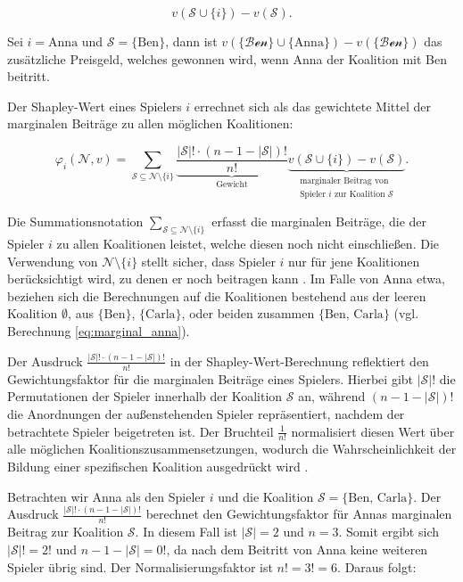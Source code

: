\begin{equation}
v(\mathcal{S} \cup \{i\}) - v(\mathcal{S}).
\label{eq:marignal}
\end{equation}


Sei $i = \text{Anna}$ und $\mathcal{S} = \{\text{Ben}\}$, dann ist $v(\mathcal{\{\text{Ben}\}} \cup \{\text{Anna}\}) - v(\mathcal{\{\text{Ben}\}})$ das
zusätzliche Preisgeld, welches gewonnen wird, wenn Anna der Koalition mit Ben beitritt. 


Der Shapley-Wert eines Spielers $i$ errechnet sich als das gewichtete Mittel der marginalen Beiträge zu allen möglichen Koalitionen:

\begin{equation}
\varphi_i (\mathcal{N}, v) = \sum_{\mathcal{S} \subseteq \mathcal{N} \setminus \{i\}} \underbrace{\frac{|\mathcal{S}|! \cdot (n - 1 - |\mathcal{S}|)!}{n!}}_{\text{Gewicht}} \underbrace{v(\mathcal{S} \cup \{i\}) - v(\mathcal{S})}_{\substack{\text{marginaler Beitrag von} \\ \text{Spieler $i$ zur Koalition $\mathcal{S}$}}}.
\end{equation}

Die Summationsnotation \(\sum_{\mathcal{S} \subseteq \mathcal{N} \setminus \{i\}}\) erfasst die marginalen Beiträge, 
die der Spieler \( i \) zu allen Koalitionen leistet, welche diesen noch nicht einschließen. Die Verwendung von 
\(\mathcal{N} \setminus \{i\}\) stellt sicher, dass Spieler \( i \) nur für jene Koalitionen berücksichtigt wird, 
zu denen er noch beitragen kann \cite[S. 22]{Molnar_2023}. Im Falle von Anna etwa, beziehen sich die Berechnungen auf die Koalitionen bestehend 
aus der leeren Koalition \(\emptyset\), aus \(\{\text{Ben}\}\), \(\{\text{Carla}\}\), oder beiden 
zusammen \(\{\text{Ben, Carla}\}\) (vgl. Berechnung \ref{eq:marginal_anna}).

Der Ausdruck \(\frac{|\mathcal{S}|! \cdot (n - 1 - |\mathcal{S}|)!}{n!}\) in der Shapley-Wert-Berechnung 
reflektiert den Gewichtungsfaktor für die marginalen Beiträge eines Spielers. Hierbei gibt \(|\mathcal{S}|!\) die Permutationen 
der Spieler innerhalb der Koalition \(\mathcal{S}\) an, während \((n - 1 - |\mathcal{S}|)!\) die Anordnungen der 
außenstehenden Spieler repräsentiert, nachdem der betrachtete Spieler beigetreten ist. 
Der Bruchteil \(\frac{1}{n!}\) normalisiert diesen Wert über alle möglichen Koalitionszusammensetzungen, 
wodurch die Wahrscheinlichkeit der Bildung einer spezifischen Koalition ausgedrückt wird \cite[S. 22]{Molnar_2023}.

Betrachten wir Anna als den Spieler $i$ und die Koalition \(\mathcal{S} = \{\text{Ben, Carla}\}\). 
Der Ausdruck \(\frac{|\mathcal{S}|! \cdot (n - 1 - |\mathcal{S}|)!}{n!}\) berechnet den Gewichtungsfaktor 
für Annas marginalen Beitrag zur Koalition \(\mathcal{S}\). In diesem Fall ist \(|\mathcal{S}| = 2\) und \(n = 3\). 
Somit ergibt sich \(|\mathcal{S}|! = 2!\) und \(n - 1 - |\mathcal{S}| = 0!\), da nach dem Beitritt von 
Anna keine weiteren Spieler übrig sind. Der Normalisierungsfaktor ist \(n! = 3! = 6\). Daraus folgt:

